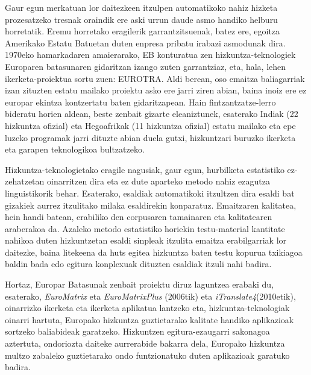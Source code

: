 \begin{multicols}{2}
 
Gaur egun merkatuan lor daitezkeen itzulpen automatikoko nahiz hizketa prozesatzeko tresnak oraindik ere aski urrun daude asmo handiko helburu horretatik. Eremu horretako eragilerik garrantzitsuenak, batez ere, egoitza Amerikako Estatu Batuetan duten enpresa pribatu irabazi asmodunak dira. 1970eko hamarkadaren amaierarako, EB konturatua zen hizkuntza-teknologiek Europaren batasunaren gidaritzan izango zuten garrantziaz, eta, hala, lehen ikerketa-proiektua sortu zuen: EUROTRA. Aldi berean, oso emaitza baliagarriak izan zituzten estatu mailako proiektu asko ere jarri ziren abian, baina inoiz ere ez europar ekintza kontzertatu baten gidaritzapean. Hain fintzantzatze-lerro bideratu horien aldean, beste zenbait gizarte eleaniztunek, esaterako Indiak (22 hizkuntza ofizial) eta Hegoafrikak (11 hizkuntza ofizial) estatu mailako eta epe luzeko programak jarri dituzte abian duela gutxi, hizkuntzari buruzko ikerketa eta garapen teknologikoa bultzatzeko.

    Hizkuntza-teknologietako eragile nagusiak, gaur egun, hurbilketa estatistiko ez-zehatzetan oinarritzen dira eta ez dute aparteko metodo nahiz ezagutza linguistikorik behar. Esaterako, esaldiak automatikoki itzultzen dira esaldi bat gizakiek aurrez itzulitako milaka esaldirekin konparatuz. Emaitzaren kalitatea, hein handi batean, erabiliko den corpusaren tamainaren eta kalitatearen araberakoa da. Azaleko metodo estatistiko horiekin testu-material kantitate nahikoa duten hizkuntzetan esaldi sinpleak itzulita emaitza erabilgarriak lor daitezke, baina litekeena da huts egitea hizkuntza baten testu kopurua txikiagoa baldin bada edo egitura konplexuak dituzten esaldiak itzuli nahi badira.

    Hortaz, Europar Batasunak zenbait proiektu diruz laguntzea erabaki du, esaterako, \textit{EuroMatrix} eta \textit{EuroMatrixPlus} (2006tik) eta \textit{iTranslate4}(2010etik), oinarrizko ikerketa eta ikerketa aplikatua lantzeko eta, hizkuntza-teknologiak oinarri hartuta, Europako hizkuntza guztietarako kalitate handiko aplikazioak sortzeko baliabideak garatzeko. Hizkuntzen egitura-ezaugarri sakonagoa aztertuta, ondoriozta daiteke aurrerabide bakarra dela, Europako hizkuntza multzo zabaleko guztietarako ondo funtzionatuko duten aplikazioak garatuko badira.


\end{multicols}
